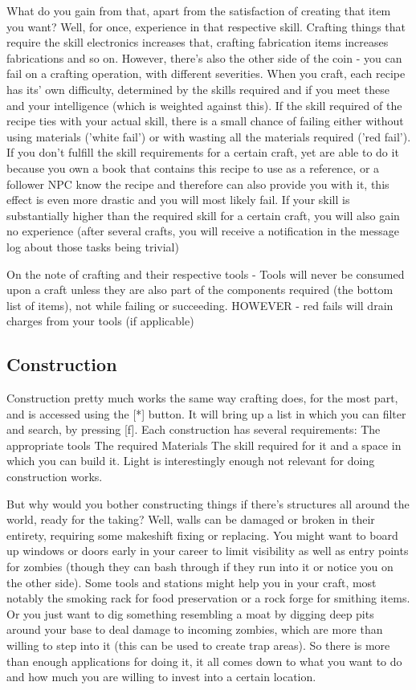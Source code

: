 \documentclass[11pt]{report}
\begin{document}
What do you gain from that, apart from the satisfaction of creating that item you want? Well, for once, experience in that respective skill. Crafting things that require the skill electronics increases that, crafting fabrication items increases fabrications and so on. However, there's also the other side of the coin - you can fail on a crafting operation, with different severities.
When you craft, each recipe has its' own difficulty, determined by the skills required and if you meet these and your intelligence (which is weighted against this). If the skill required of the recipe ties with your actual skill, there is a small chance of failing either without using materials ('white fail') or with wasting all the materials required ('red fail'). If you don't fulfill the skill requirements for a certain craft, yet are able to do it because you own a book that contains this recipe to use as a reference, or a follower NPC know the recipe and therefore can also provide you with it, this effect is even more drastic and you will most likely fail. If your skill is substantially higher than the required skill for a certain craft, you will also gain no experience (after several crafts, you will receive a notification in the message log about those tasks being trivial)

On the note of crafting and their respective tools - Tools will never be consumed upon a craft unless they are also part of the components required (the bottom list of items), not while failing or succeeding. HOWEVER - red fails will drain charges from your tools (if applicable)

\subsection{Construction}

Construction pretty much works the same way crafting does, for the most part, and is accessed using the [*] button. It will bring up a list in which you can filter and search, by pressing [f]. Each construction has several requirements:
The appropriate tools
The required Materials
The skill required for it
and a space in which you can build it.
Light is interestingly enough not relevant for doing construction works.

But why would you bother constructing things if there's structures all around the world, ready for the taking? Well, walls can be damaged or broken in their entirety, requiring some makeshift fixing or replacing. You might want to board up windows or doors early in your career to limit visibility as well as entry points for zombies (though they can bash through if they run into it or notice you on the other side). Some tools and stations might help you in your craft, most notably the smoking rack for food preservation or a rock forge for smithing items. Or you just want to dig something resembling a moat by digging deep pits around your base to deal damage to incoming zombies, which are more than willing to step into it (this can be used to create trap areas). So there is more than enough applications for doing it, it all comes down to what you want to do and how much you are willing to invest into a certain location.
\end{document}
